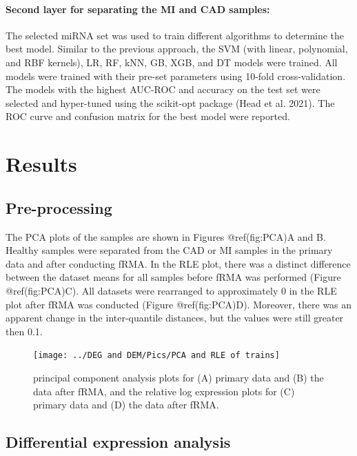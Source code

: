 \documentclass[
]{article}
\begin{document}
\hypertarget{second-layer-for-separating-the-mi-and-cad-samples-1}{%
\paragraph{Second layer for separating the MI and CAD
samples:}\label{second-layer-for-separating-the-mi-and-cad-samples-1}}

The selected miRNA set was used to train different algorithms to
determine the best model. Similar to the previous approach, the SVM
(with linear, polynomial, and RBF kernels), LR, RF, kNN, GB, XGB, and DT
models were trained. All models were trained with their pre-set
parameters using 10-fold cross-validation. The models with the highest
AUC-ROC and accuracy on the test set were selected and hyper-tuned using
the scikit-opt package (Head et al. 2021). The ROC curve and confusion
matrix for the best model were reported.

\hypertarget{results}{%
\section{Results}\label{results}}

\hypertarget{pre-processing-1}{%
\subsection{Pre-processing}\label{pre-processing-1}}

The PCA plots of the samples are shown in Figures @ref(fig:PCA)A and B.
Healthy samples were separated from the CAD or MI samples in the primary
data and after conducting fRMA. In the RLE plot, there was a distinct
difference between the dataset means for all samples before fRMA was
performed (Figure @ref(fig:PCA)C). All datasets were rearranged to
approximately 0 in the RLE plot after fRMA was conducted (Figure
@ref(fig:PCA)D). Moreover, there was an apparent change in the
inter-quantile distances, but the values were still greater then 0.1.

\begin{figure}
\texttt{[image: ../DEG and DEM/Pics/PCA and RLE of trains]} \caption{principal component analysis plots for (A) primary data and (B) the data after fRMA, and the relative log expression plots for (C) primary data and (D) the data after fRMA.}\label{fig:PCA}
\end{figure}

\hypertarget{differential-expression-analysis-1}{%
\subsection{Differential expression
analysis}\label{differential-expression-analysis-1}}
\end{document}
